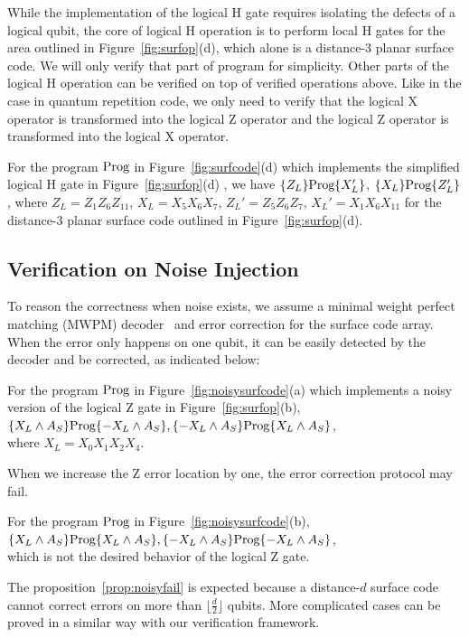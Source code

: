 While the implementation of the logical H gate requires isolating the defects of a logical qubit, the core of logical H operation is to perform local H gates for the area outlined in Figure~\ref{fig:surfop}(d), which alone is a distance-$3$ planar surface code. We will only verify that part of program for simplicity. Other parts of the logical H operation can be verified on top of verified operations above. Like in the case in quantum repetition code, we only need to verify that the logical X operator is transformed into the logical Z operator and the logical Z operator is transformed into the logical X operator. 
\nothmskip
\begin{proposition}
	For the program $\text{Prog}$ in Figure~\ref{fig:surfcode}(d) which implements the simplified logical H gate in Figure~\ref{fig:surfop}(d) , we have
	$\{Z_L\}\text{Prog}\{X_L' \}$, $\{X_L\}\text{Prog}\{Z_L'\}$, 
	where $Z_L = Z_{1}Z_{6}Z_{11}$, $X_L = X_{5}X_{6}X_{7}$, $Z_L' = Z_{5}Z_{6}Z_{7}$, $X_L' = X_{1}X_{6}X_{11}$ for the distance-$3$ planar surface code  outlined in Figure~\ref{fig:surfop}(d).
\end{proposition} \nothmskip

\subsection{Verification on Noise Injection}



To reason the correctness when noise exists, we assume a minimal weight perfect matching (MWPM) decoder~\cite{Fowler2015MinimumWP} and error correction for the surface code array.
When the error only happens on one qubit, it can be easily detected by the decoder and be corrected, as indicated below:
\nothmskip
\begin{proposition}
For the program $\text{Prog}$ in Figure~\ref{fig:noisysurfcode}(a) which implements a noisy version of the logical Z gate in Figure~\ref{fig:surfop}(b), \\
$\{X_L \wedge A_S\}\text{Prog}\{-X_L \wedge A_S\}, \{-X_L \wedge A_S\}\text{Prog}\{X_L \wedge A_S\}$, \\
where $X_L = X_{0}X_{1}X_{2}X_{4}$.
\end{proposition} \nothmskip

When we increase the Z error location by one, the error correction protocol may fail.
\nothmskip
\begin{proposition}\label{prop:noisyfail}
For the program $\text{Prog}$ in Figure~\ref{fig:noisysurfcode}(b), \\
$\{X_L \wedge A_S\}\text{Prog}\{X_L \wedge A_S\}, \{-X_L \wedge A_S\}\text{Prog}\{-X_L \wedge A_S\}$,\\
which is not the desired behavior of the logical Z gate.
\end{proposition} \nothmskip

The proposition~\ref{prop:noisyfail} is expected because a distance-$d$ surface code cannot correct errors on more than $\lfloor\frac{d}{2} \rfloor$ qubits.
More complicated cases can be proved in a similar way with our verification framework. 




